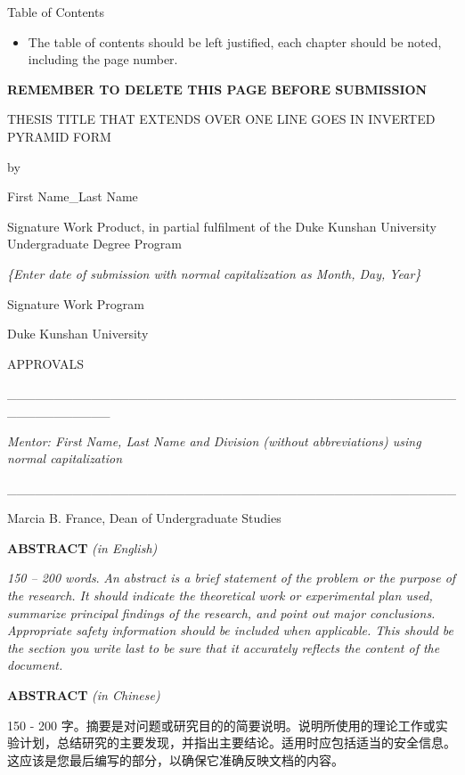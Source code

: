 \documentclass[
]{article}
\begin{document}
    Table of Contents

    \begin{itemize}
        \item
        The table of contents should be left justified, each chapter should be
        noted, including the page number.
    \end{itemize}

    \textbf{REMEMBER TO DELETE THIS PAGE BEFORE SUBMISSION}

    THESIS TITLE THAT EXTENDS OVER ONE LINE GOES IN INVERTED PYRAMID FORM

    by

    First Name\_Last Name

    Signature Work Product, in partial fulfilment of the Duke Kunshan
    University Undergraduate Degree Program

    \emph{\{Enter date of submission with normal capitalization as Month,
        Day, Year\}}

    Signature Work Program

    Duke Kunshan University

    APPROVALS

    \_\_\_\_\_\_\_\_\_\_\_\_\_\_\_\_\_\_\_\_\_\_\_\_\_\_\_\_\_\_\_\_\_\_\_\_\_\_\_\_\_\_\_\_\_\_\_\_\_\_\_\_\_\_\_\_\_\_\_

    \emph{Mentor: First Name, Last Name and Division (without abbreviations)
        using normal capitalization}

    \_\_\_\_\_\_\_\_\_\_\_\_\_\_\_\_\_\_\_\_\_\_\_\_\_\_\_\_\_\_\_\_\_\_\_\_\_\_\_\_\_\_\_\_\_\_\_\_

    Marcia B. France, Dean of Undergraduate Studies

    \protect\hypertarget{_Toc93021168}{}{}\textbf{ABSTRACT} \emph{(in
    English)}

    \emph{150 -- 200 words}. \emph{An abstract is a brief statement of the
    problem or the purpose of the research. It should indicate the
    theoretical work or experimental plan used, summarize principal findings
    of the research, and point out major conclusions. Appropriate safety
    information should be included when applicable. This should be the
    section you write last to be sure that it accurately reflects the
    content of the document.}

    \protect\hypertarget{_Toc93021169}{}{}\textbf{ABSTRACT} \emph{(in
    Chinese)}

    150 - 200
    字。摘要是对问题或研究目的的简要说明。说明所使用的理论工作或实验计划，总结研究的主要发现，并指出主要结论。适用时应包括适当的安全信息。这应该是您最后编写的部分，以确保它准确反映文档的内容。
\end{document}
